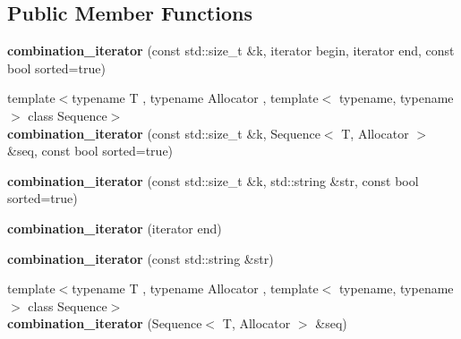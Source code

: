 \subsection*{Public Member Functions}
\begin{DoxyCompactItemize}
\item 
\hypertarget{classstrtk_1_1combination__iterator_a3ff96c3eb259eba138d6618cef146824}{{\bfseries combination\-\_\-iterator} (const std\-::size\-\_\-t \&k, iterator begin, iterator end, const bool sorted=true)}\label{classstrtk_1_1combination__iterator_a3ff96c3eb259eba138d6618cef146824}

\item 
\hypertarget{classstrtk_1_1combination__iterator_ae511b7bc0d36650c6d57fc92d4d6a07a}{{\footnotesize template$<$typename T , typename Allocator , template$<$ typename, typename $>$ class Sequence$>$ }\\{\bfseries combination\-\_\-iterator} (const std\-::size\-\_\-t \&k, Sequence$<$ T, Allocator $>$ \&seq, const bool sorted=true)}\label{classstrtk_1_1combination__iterator_ae511b7bc0d36650c6d57fc92d4d6a07a}

\item 
\hypertarget{classstrtk_1_1combination__iterator_a45dc3c0696583fd08d465837202bcdb5}{{\bfseries combination\-\_\-iterator} (const std\-::size\-\_\-t \&k, std\-::string \&str, const bool sorted=true)}\label{classstrtk_1_1combination__iterator_a45dc3c0696583fd08d465837202bcdb5}

\item 
\hypertarget{classstrtk_1_1combination__iterator_a4124f837ef476c0e13aa3555f22b1160}{{\bfseries combination\-\_\-iterator} (iterator end)}\label{classstrtk_1_1combination__iterator_a4124f837ef476c0e13aa3555f22b1160}

\item 
\hypertarget{classstrtk_1_1combination__iterator_aef5b80423e9025d7c20767e2f3598f18}{{\bfseries combination\-\_\-iterator} (const std\-::string \&str)}\label{classstrtk_1_1combination__iterator_aef5b80423e9025d7c20767e2f3598f18}

\item 
\hypertarget{classstrtk_1_1combination__iterator_aaeb6dba7bbd862d2518674fbf6e09617}{{\footnotesize template$<$typename T , typename Allocator , template$<$ typename, typename $>$ class Sequence$>$ }\\{\bfseries combination\-\_\-iterator} (Sequence$<$ T, Allocator $>$ \&seq)}\label{classstrtk_1_1combination__iterator_aaeb6dba7bbd862d2518674fbf6e09617}


\end{DoxyCompactItemize}
